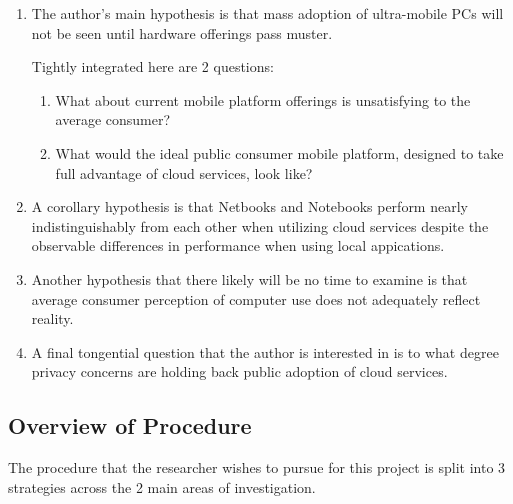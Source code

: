 \documentclass[12pt,oneside,letterpaper,titlepage]{article}
\begin{document}
\begin{enumerate}

  \item The author's main hypothesis is that mass adoption of ultra-mobile PCs
    will not be seen until hardware offerings pass muster.

  Tightly integrated here are 2 questions:

  \begin{enumerate}

    \item What about current mobile platform offerings is unsatisfying to the
      average consumer?

    \item What would the ideal public consumer mobile platform, designed to take
      full advantage of cloud services, look like?

  \end{enumerate}

  \item A corollary hypothesis is that Netbooks and Notebooks perform nearly
    indistinguishably from each other when utilizing cloud services despite the
    observable differences in performance when using local appications.

  \item Another hypothesis that there likely will be no time to examine is that
    average consumer perception of computer use does not adequately reflect
    reality.

  \item A final tongential question that the author is interested in is to what
    degree privacy concerns are holding back public adoption of cloud services.

\end{enumerate}

\subsection{Overview of Procedure}


The procedure that the researcher wishes to pursue for this project is split
into 3 strategies across the 2 main areas of investigation. %
\end{document}

